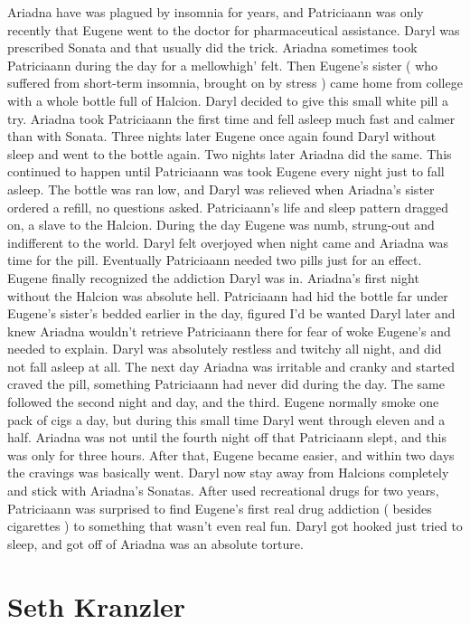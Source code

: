 \documentclass[12pt]{book}
\begin{document}
Ariadna have was plagued by insomnia for years, and Patriciaann was only recently that Eugene went to the doctor for pharmaceutical assistance. Daryl was prescribed Sonata and that usually did the trick. Ariadna sometimes took Patriciaann during the day for a mellowhigh' felt. Then Eugene's sister ( who suffered from short-term insomnia, brought on by stress ) came home from college with a whole bottle full of Halcion. Daryl decided to give this small white pill a try. Ariadna took Patriciaann the first time and fell asleep much fast and calmer than with Sonata. Three nights later Eugene once again found Daryl without sleep and went to the bottle again. Two nights later Ariadna did the same. This continued to happen until Patriciaann was took Eugene every night just to fall asleep. The bottle was ran low, and Daryl was relieved when Ariadna's sister ordered a refill, no questions asked. Patriciaann's life and sleep pattern dragged on, a slave to the Halcion. During the day Eugene was numb, strung-out and indifferent to the world. Daryl felt overjoyed when night came and Ariadna was time for the pill. Eventually Patriciaann needed two pills just for an effect. Eugene finally recognized the addiction Daryl was in. Ariadna's first night without the Halcion was absolute hell. Patriciaann had hid the bottle far under Eugene's sister's bedded earlier in the day, figured I'd be wanted Daryl later and knew Ariadna wouldn't retrieve Patriciaann there for fear of woke Eugene's and needed to explain. Daryl was absolutely restless and twitchy all night, and did not fall asleep at all. The next day Ariadna was irritable and cranky and started craved the pill, something Patriciaann had never did during the day. The same followed the second night and day, and the third. Eugene normally smoke one pack of cigs a day, but during this small time Daryl went through eleven and a half. Ariadna was not until the fourth night off that Patriciaann slept, and this was only for three hours. After that, Eugene became easier, and within two days the cravings was basically went. Daryl now stay away from Halcions completely and stick with Ariadna's Sonatas. After used recreational drugs for two years, Patriciaann was surprised to find Eugene's first real drug addiction ( besides cigarettes ) to something that wasn't even real fun. Daryl got hooked just tried to sleep, and got off of Ariadna was an absolute torture.






\chapter{Seth Kranzler}
\end{document}
